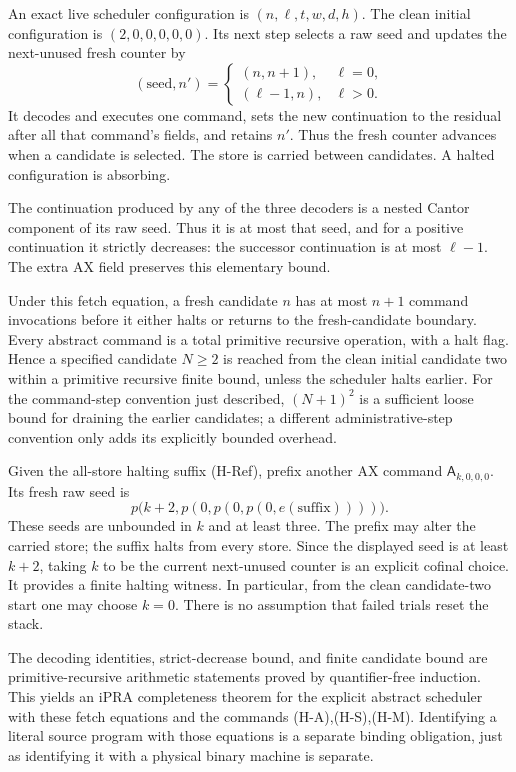 An exact live scheduler configuration is $(n,\ell,t,w,d,h)$.
The clean initial configuration is $(2,0,0,0,0,0)$. Its next step
selects a raw seed and updates the next-unused fresh counter by
\[
 (\text{seed},n')=
 \begin{cases}
 (n,n+1),&\ell=0,\\
 (\ell-1,n),&\ell>0.
 \end{cases}
\]
It decodes and executes one command, sets the new continuation to the
residual after all that command's fields, and retains $n'$. Thus the
fresh counter advances when a candidate is selected. The store is
carried between candidates. A halted configuration is absorbing.

The continuation produced by any of the
three decoders is a nested Cantor component of its raw seed. Thus
it is at most that seed, and for a positive continuation it
strictly decreases: the successor continuation is at most
$\ell-1$. The extra AX field preserves this elementary bound.

Under this fetch equation, a fresh candidate $n$ has at most
$n+1$ command invocations before it either halts or returns to
the fresh-candidate boundary. Every abstract command is a total
primitive recursive operation, with a halt flag. Hence a
specified candidate $N\ge2$ is reached from the clean initial
candidate two within a primitive recursive finite bound, unless
the scheduler halts earlier. For the command-step convention just
described, $(N+1)^2$ is a sufficient loose bound for draining the
earlier candidates; a different administrative-step convention
only adds its explicitly bounded overhead.

Given the all-store halting suffix (H-Ref), prefix another AX
command $\mathsf A_{k,0,0,0}$. Its fresh raw seed is
\[
 p\bigl(k+2,p(0,p(0,p(0,e(\text{suffix}))))\bigr).        \tag{H-Cof}
\]
These seeds are unbounded in $k$ and at least three. The prefix
may alter the carried store; the suffix halts from every store.
Since the displayed seed is at least $k+2$, taking $k$ to be the
current next-unused counter is an explicit cofinal choice. It
provides a finite halting witness. In
particular, from the clean candidate-two start one may choose
$k=0$. There is no assumption that failed trials reset the stack.

The decoding identities, strict-decrease bound, and finite
candidate bound are primitive-recursive arithmetic statements
proved by quantifier-free induction. This yields an iPRA
completeness theorem for the explicit abstract scheduler with
these fetch equations and the commands (H-A),(H-S),(H-M).
Identifying a literal source program with those equations is a
separate binding obligation, just as identifying it with a
physical binary machine is separate.

